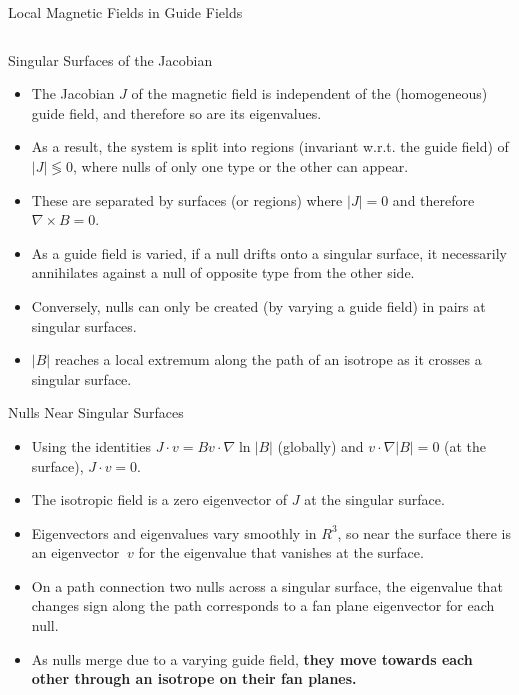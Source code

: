 \documentclass[final]{beamer}
\newlength{\onecolwid}
\newlength{\twocolwid}
\begin{document}
\begin{frame}[t]
\begin{columns}[t]
\begin{column}{\twocolwid}
\begin{block}{\huge{Local Magnetic Fields in Guide Fields}}
\begin{columns}[t,totalwidth=\twocolwid]
\begin{column}{\onecolwid}
\begin{block}{Singular Surfaces of the Jacobian}
  \begin{itemize}
    \item The Jacobian $J$ of the magnetic field is independent of the (homogeneous) guide field,
      and therefore so are its eigenvalues.
    \item As a result, the system is split into regions (invariant w.r.t. the guide field) of $|J|\lessgtr 0$,
      where nulls of only one type or the other can appear.
    \item These are separated by surfaces (or regions) where $|J|=0$ and therefore $\nabla\times B=0$.
    \item As a guide field is varied, if a null drifts onto a singular surface, it necessarily annihilates
      against a null of opposite type from the other side.
    \item Conversely, nulls can only be created (by varying a guide field) in pairs at singular surfaces.
    \item $|B|$ reaches a local extremum along the path of an isotrope as it crosses a singular surface.
    \end{itemize}
\end{block}

\begin{block}{Nulls Near Singular Surfaces}
  \begin{itemize}
    \item Using the identities $J\cdot v=B v\cdot \nabla \ln|B|$ (globally) and $v\cdot \nabla |B|=0$ (at the surface), $J\cdot v=0$.
    \item The isotropic field is a zero eigenvector of $J$ at the singular surface.
    \item Eigenvectors and eigenvalues vary smoothly in $R^3$,
      so near the surface there is an eigenvector $~v$ for the eigenvalue that vanishes at the surface.
    \item On a path connection two nulls across a singular surface,
      the eigenvalue that changes sign along the path corresponds to
      a fan plane eigenvector for each null.
    \item As nulls merge due to a varying guide field,
      \textbf{they move towards each other through an isotrope on their fan planes.}
  \end{itemize}
\end{block}
\end{column}
\end{columns}
\end{block}


\end{column}
\end{columns}
\end{frame}
\end{document}
